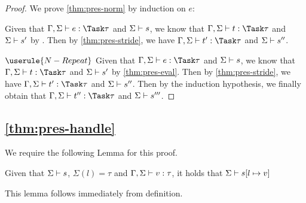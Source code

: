 \begin{proof}
  We prove \cref{thm:pres-norm} by induction on $e$:

    {Given that
    $\Gamma,\Sigma\infers e:\Task\tau$ and $\Sigma\vdash s$, we know that $\Gamma,\Sigma\infers t:\Task\tau$ and $\Sigma\vdash s'$ by
    .
    Then by \cref{thm:pres-stride}, we have $\Gamma,\Sigma\infers t':\Task\tau$ and $\Sigma\vdash s''$.}

  \case
    {$\userule{N-Repeat}$}
    { Given that $\Gamma,\Sigma\infers e:\Task\tau$ and $\Sigma\vdash s$, we know that $\Gamma,\Sigma\infers t:\Task\tau$ and $\Sigma\vdash s'$ by \cref{thm:pres-eval}.
    Then by \cref{thm:pres-stride}, we have $\Gamma,\Sigma\infers t':\Task\tau$ and $\Sigma\vdash s''$.
    Then by the induction hypothesis, we finally obtain that $\Gamma,\Sigma\infers t'':\Task\tau$ and $\Sigma\vdash s'''$.}

\end{proof}



\subsection{\cref{thm:pres-handle}}

We require the following Lemma for this proof.

\begin{lemma}
  Given that $\Sigma\vdash s$, $\Sigma(l)=\tau$ and $\Gamma,\Sigma\vdash v:\tau$, it holds that $\Sigma\vdash s[l\mapsto v]$
  \label{lemmasigmaconsistent}
\end{lemma}
This lemma follows immediately from definition.

